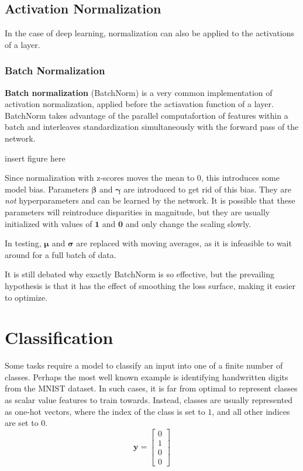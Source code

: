\documentclass[12pt]{report}
\theoremstyle{definition}
\theoremstyle{remark}
\begin{document}
\subsection{Activation Normalization}
In the case of deep learning, normalization can also be applied to the activations of a layer.

\subsubsection{Batch Normalization}
\textbf{Batch normalization} (BatchNorm) is a very common implementation of activation normalization, applied before the actiavation function of a layer. BatchNorm takes advantage of the parallel computafortion of features within a batch and interleaves standardization simultaneously with the forward pass of the network.

insert figure here

Since normalization with z-scores moves the mean to $0$, this introduces some model bias. Parameters $\boldsymbol{\beta}$ and $\boldsymbol{\gamma}$ are introduced to get rid of this bias. They are \textit{not} hyperparameters and can be learned by the network. It is possible that these parameters will reintroduce disparities in magnitude, but they are usually initialized with values of $\mathbf{1}$ and $\mathbf{0}$ and only change the scaling slowly.

In testing, $\boldsymbol{\mu}$ and $\boldsymbol{\sigma}$ are replaced with moving averages, as it is infeasible to wait around for a full batch of data.

It is still debated why exactly BatchNorm is so effective, but the prevailing hypothesis is that it has the effect of smoothing the loss surface, making it easier to optimize.
\cite{ioffe_batch_2015}\cite{ioffe_batch_2017}\cite{santurkar_how_2019}

\section{Classification}\label{sec:classification}
Some tasks require a model to classify an input into one of a finite number of classes. Perhaps the most well known example is identifying handwritten digits from the MNIST dataset. In such cases, it is far from optimal to represent classes as scalar value features to train towards. Instead, classes are usually represented as one-hot vectors, where the index of the class is set to $1$, and all other indices are set to $0$.
\begin{equation}
    \mathbf{y} = \begin{bmatrix}
        0 \\
        1 \\
        0 \\
        0
    \end{bmatrix}
\end{equation}
\end{document}
